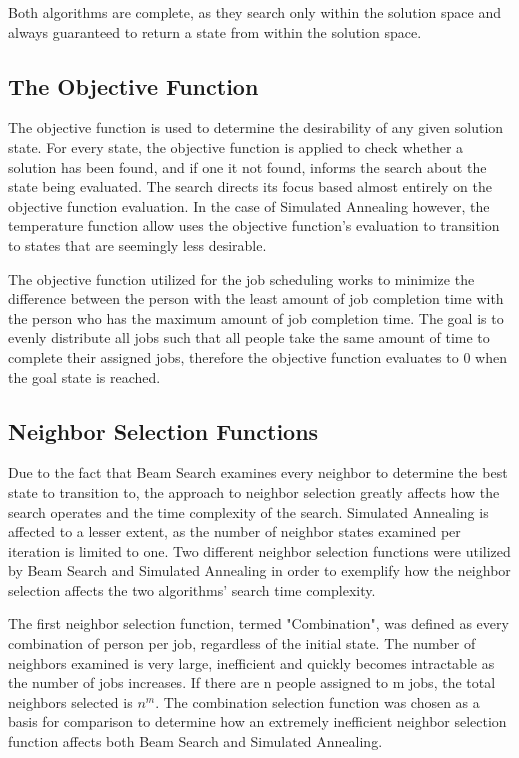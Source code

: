 \documentclass[10pt, twocolumn]{article}
\begin{document}
Both algorithms are complete, as they search only within the solution space and always guaranteed to return a state from within the solution space.

\subsection{The Objective Function}

The objective function is used to determine the desirability of any given solution state. For every state, the objective function is applied to check whether a solution has been found, and if one it not found, informs the search about the state being evaluated. The search directs its focus based almost entirely on the objective function evaluation. In the case of Simulated Annealing however, the temperature function allow uses the objective function's evaluation to transition to states that are seemingly less desirable.

The objective function utilized for the job scheduling works to minimize the difference between the person with the least amount of job completion time with the person who has the maximum amount of job completion time. The goal is to evenly distribute all jobs such that all people take the same amount of time to complete their assigned jobs, therefore the objective function evaluates to 0 when the goal state is reached.

\subsection{Neighbor Selection Functions}

Due to the fact that Beam Search examines every neighbor to determine the best state to transition to, the approach to neighbor selection greatly affects how the search operates and the time complexity of the search. Simulated Annealing is affected to a lesser extent, as the number of neighbor states examined per iteration is limited to one. Two different neighbor selection functions were utilized by Beam Search and Simulated Annealing in order to exemplify how the neighbor selection affects the two algorithms' search time complexity.

The first neighbor selection function, termed "Combination", was defined as every combination of person per job, regardless of the initial state. The number of neighbors examined is very large, inefficient and quickly becomes intractable as the number of jobs increases. If there are n people assigned to m jobs, the total neighbors selected is $n^m$. The combination selection function was chosen as a basis for comparison to determine how an extremely inefficient neighbor selection function affects both Beam Search and Simulated Annealing.
\end{document}
